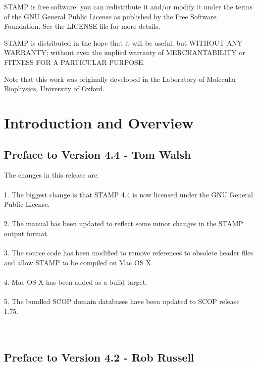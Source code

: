 \begin{titlepage}
\begin{center}
        STAMP is free software: you can redistribute it and/or modify
        it under the terms of the GNU General Public License as published by
        the Free Software Foundation. See the LICENSE file for more details.

        STAMP is distributed in the hope that it will be useful,
        but WITHOUT ANY WARRANTY; without even the implied warranty of
        MERCHANTABILITY or FITNESS FOR A PARTICULAR PURPOSE. 

        \vskip 0.1in

        Note that this work was originally developed in the Laboratory of Molecular
        Biophysics, University of Oxford.
        \noindent

    \end{center}

\end{titlepage}

\tableofcontents

\parindent 0in

\chapter{Introduction and Overview}
\section{Preface to Version 4.4 - Tom Walsh}
The changes in this release are:\\
\\
1. The biggest change is that STAMP 4.4 is now licensed under the GNU General Public License.\\
\\
2. The manual has been updated to reflect some minor changes in the STAMP output format.\\
\\
3. The source code has been modified to remove references to obsolete header files and
allow STAMP to be compiled on Mac OS X.\\
\\
4. Mac OS X has been added as a build target.\\
\\
5. The bundled SCOP domain databases have been updated to SCOP release 1.75.\\
\\
\\
\section{Preface to Version 4.2 - Rob Russell}

